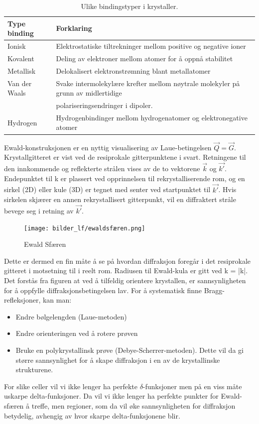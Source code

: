 \documentclass{article}
\begin{document}
\begin{table}[h]
\centering
\begin{tabular}{ll}
\toprule
Type binding & Forklaring \\
\midrule
Ionisk & Elektrostatiske tiltrekninger mellom positive og negative ioner \\
Kovalent & Deling av elektroner mellom atomer for å oppnå stabilitet \\
Metallisk & Delokalisert elektronstrømning blant metallatomer \\
Van der Waals & Svake intermolekylære krefter mellom nøytrale molekyler på grunn av midlertidige \\ & polariseringsendringer i dipoler. \\
Hydrogen & Hydrogenbindinger mellom hydrogenatomer og elektronegative atomer \\
\bottomrule
\end{tabular}
\caption{Ulike bindingstyper i krystaller.}
\label{tab:bindingstyper}
\end{table}
Ewald-konstruksjonen er en nyttig visualisering av Laue-betingelsen $\vec{Q}=\vec{G}$. Krystallgitteret er vist ved de resiprokale gitterpunktene i svart. Retningene til den innkommende og reflekterte strålen vises av de to vektorene $\vec{k}$ og $\vec{k'}$. Endepunktet til k er plassert ved opprinnelsen til rekrystalliserende rom, og en sirkel (2D) eller kule (3D) er tegnet med senter ved startpunktet til $\vec{k'}$. Hvis sirkelen skjærer en annen rekrystallisert gitterpunkt, vil en diffraktert stråle bevege seg i retning av $\vec{k'}$.
\begin{figure}[H]
    \centering
    \texttt{[image: bilder\_lf/ewaldsfæren.png]}
    \caption{Ewald Sfæren}
    \label{fig:ewaldsfæren}
\end{figure}
Dette er dermed en fin måte å se på hvordan diffraksjon foregår i det resiprokale gitteret i motsetning til i reelt rom.
Radiusen til Ewald-kula er gitt ved k = |k|. Det forstås fra figuren at ved å tilfeldig orientere krystallen, er sannsynligheten for å oppfylle diffraksjonsbetingelsen lav. For å systematisk finne Bragg-refleksjoner, kan man:
\begin{itemize}
    \item Endre bølgelengden (Laue-metoden)
    \item Endre orienteringen ved å rotere prøven
    \item Bruke en polykrystallinsk prøve (Debye-Scherrer-metoden). Dette vil da gi større sannsynlighet for å skape diffraksjon i en av de krystallinske strukturene.
\end{itemize}
For slike celler vil vi ikke lenger ha perfekte $\delta$-funksjoner men på en viss måte uskarpe delta-funksjoner. Da vil vi ikke lenger ha perfekte punkter for Ewald-sfæren å treffe, men regioner, som da vil øke sannsynligheten for diffraksjon betydelig, avhengig av hvor skarpe delta-funksjonene blir.
\end{document}
